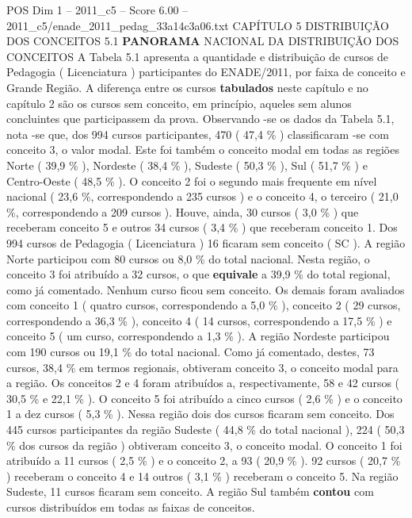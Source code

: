 \begin{textsample}{POS Dim 1 – 2011\_c5 – Score 6.00 – 2011\_c5/enade\_2011\_pedag\_33a14c3a06.txt}  \label{ex:f1_pos_127}
CAPÍTULO 5 DISTRIBUIÇÃO DOS CONCEITOS 5.1 \textbf{PANORAMA} NACIONAL DA DISTRIBUIÇÃO DOS CONCEITOS A Tabela 5.1 apresenta a quantidade e distribuição de cursos de Pedagogia ( Licenciatura ) participantes do ENADE/2011, por faixa de conceito e Grande Região.
A diferença entre os cursos \textbf{tabulados} neste capítulo e no capítulo 2 são os cursos sem conceito, em princípio, aqueles sem alunos concluintes que participassem da prova.
Observando -se os dados da Tabela 5.1, nota -se que, dos 994 cursos participantes, 470 ( 47,4 \% ) classificaram -se com conceito 3, o valor modal.
Este foi também o conceito modal em todas as regiões Norte ( 39,9 \% ), Nordeste ( 38,4 \% ), Sudeste ( 50,3 \% ), Sul ( 51,7 \% ) e Centro-Oeste ( 48,5 \% ).
O conceito 2 foi o segundo mais frequente em nível nacional ( 23,6 \%, correspondendo a 235 cursos ) e o conceito 4, o terceiro ( 21,0 \%, correspondendo a 209 cursos ).
Houve, ainda, 30 cursos ( 3,0 \% ) que receberam conceito 5 e outros 34 cursos ( 3,4 \% ) que receberam conceito 1.
Dos 994 cursos de Pedagogia ( Licenciatura ) 16 ficaram sem conceito ( SC ).
A região Norte participou com 80 cursos ou 8,0 \% do total nacional.
Nesta região, o conceito 3 foi atribuído a 32 cursos, o que \textbf{equivale} a 39,9 \% do total regional, como já comentado.
Nenhum curso ficou sem conceito.
Os demais foram avaliados com conceito 1 ( quatro cursos, correspondendo a 5,0 \% ), conceito 2 ( 29 cursos, correspondendo a 36,3 \% ), conceito 4 ( 14 cursos, correspondendo a 17,5 \% ) e conceito 5 ( um curso, correspondendo a 1,3 \% ).
A região Nordeste participou com 190 cursos ou 19,1 \% do total nacional.
Como já comentado, destes, 73 cursos, 38,4 \% em termos regionais, obtiveram conceito 3, o conceito modal para a região.
Os conceitos 2 e 4 foram atribuídos a, respectivamente, 58 e 42 cursos ( 30,5 \% e 22,1 \% ).
O conceito 5 foi atribuído a cinco cursos ( 2,6 \% ) e o conceito 1 a dez cursos ( 5,3 \% ).
Nessa região dois dos cursos ficaram sem conceito.
Dos 445 cursos participantes da região Sudeste ( 44,8 \% do total nacional ), 224 ( 50,3 \% dos cursos da região ) obtiveram conceito 3, o conceito modal.
O conceito 1 foi atribuído a 11 cursos ( 2,5 \% ) e o conceito 2, a 93 ( 20,9 \% ). 92 cursos ( 20,7 \% ) receberam o conceito 4 e 14 outros ( 3,1 \% ) receberam o conceito 5.
Na região Sudeste, 11 cursos ficaram sem conceito.
A região Sul também \textbf{contou} com cursos distribuídos em todas as faixas de conceitos.

\end{textsample}
